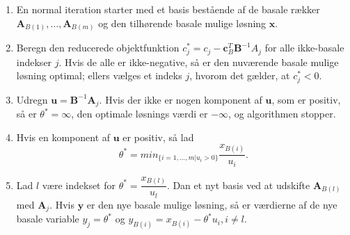 \begin{tcolorbox}[
title=Den naive implementering,
colback		= myblue!15,
colframe	= myblue!15,
coltitle	= black,
before skip	= 20pt plus 2pt,
after skip	= 20pt plus 2pt,
fonttitle	= \bfseries]
\begin{enumerate}
\item En normal iteration starter med et basis bestående af de basale rækker $\textbf{A}_{B(1)},\ldots,\textbf{A}_{B(m)}$ og den tilhørende basale mulige løsning $\textbf{x}$.
\item Beregn den reducerede objektfunktion $c_j^* = c_j - \mathbf{c}_B^T \textbf{B}^{-1}A_j$ for alle ikke-basale indekser $j$. Hvis de alle er ikke-negative, så er den nuværende basale mulige løsning optimal; ellers vælges et indeks $j$, hvorom det gælder, at $c^*_j<0.$
\item Udregn $\textbf{u}=\textbf{B}^{-1}\textbf{A}_j$. Hvis der ikke er nogen komponent af $\textbf{u}$, som er positiv, så er $\theta ^*=\infty$, den optimale løsnings værdi er $-\infty$, og algorithmen stopper.
\item Hvis en komponent af $\textbf{u}$ er positiv, så lad 
$$\theta^*= min_{ \{i=1,\ldots,m|u_i>0 \} }        \dfrac{x_{B(i)}}{u_i}.$$
\item Lad $l$ være indekset for $\theta^*=  \dfrac{x_{B(l)}}{u_l}$. Dan et nyt basis ved at udskifte $\textbf{A}_{B(l)}$ med $\textbf{A}_j$. Hvis $\textbf{y}$ er den nye basale mulige løsning, så er værdierne af de nye basale variable $y_j=\theta^*$ og $y_{B(i)}=x_{B(i)}-\theta^*u_i,i\neq l.$
\end{enumerate}
\end{tcolorbox}
%
